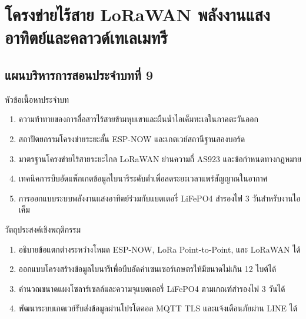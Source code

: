 \chapter{โครงข่ายไร้สาย LoRaWAN พลังงานแสงอาทิตย์และคลาวด์เทเลเมทรี}
\label{chap:ch09}

\section*{แผนบริหารการสอนประจำบทที่ 9}

\begin{planbox}{หัวข้อเนื้อหาประจำบท}
\begin{enumerate}[topsep=2pt, itemsep=1pt, partopsep=0pt, parsep=0pt, leftmargin=1.5em]
    \item ความท้าทายของการสื่อสารไร้สายข้ามหุบเขาและผืนน้ำไอเค็มทะเลในภาคตะวันออก
    \item สถาปัตยกรรมโครงข่ายระยะสั้น ESP-NOW และเกตเวย์สถานีฐานสองบอร์ด
    \item มาตรฐานโครงข่ายไร้สายระยะไกล LoRaWAN ย่านความถี่ AS923 และข้อกำหนดทางกฎหมาย
    \item เทคนิคการบีบอัดแพ็กเกตข้อมูลไบนารีระดับต่ำเพื่อลดระยะเวลาแพร่สัญญาณในอากาศ
    \item การออกแบบระบบพลังงานแสงอาทิตย์ร่วมกับแบตเตอรี่ LiFePO4 สำรองไฟ 3 วันสำหรับงานไอเค็ม
\end{enumerate}
\end{planbox}

\begin{planbox}{วัตถุประสงค์เชิงพฤติกรรม}
\begin{enumerate}[topsep=2pt, itemsep=1pt, partopsep=0pt, parsep=0pt, leftmargin=1.5em]
    \item อธิบายข้อแตกต่างระหว่างโหมด ESP-NOW, LoRa Point-to-Point, และ LoRaWAN ได้
    \item ออกแบบโครงสร้างข้อมูลไบนารีเพื่อบีบอัดค่าเซนเซอร์เกษตรให้มีขนาดไม่เกิน 12 ไบต์ได้
    \item คำนวณขนาดแผงโซลาร์เซลล์และความจุแบตเตอรี่ LiFePO4 ตามเกณฑ์สำรองไฟ 3 วันได้
    \item พัฒนาระบบเกตเวย์รับส่งข้อมูลผ่านโปรโตคอล MQTT TLS และแจ้งเตือนภัยผ่าน LINE ได้
\end{enumerate}
\end{planbox}

\newpage

